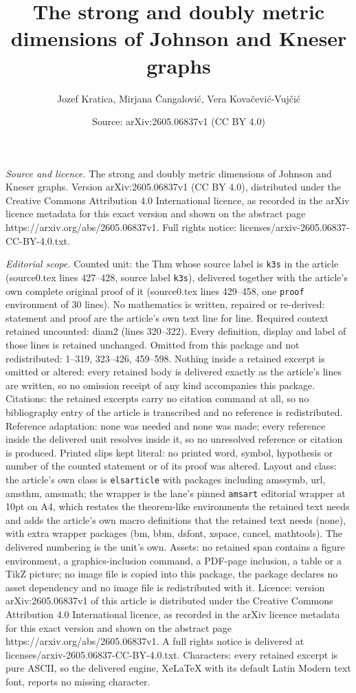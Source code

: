 \documentclass[10pt,a4paper]{amsart}
\title[The strong and doubly metric dimensions of Johnson and Knese]{The strong and doubly metric dimensions of Johnson and Kneser graphs}
\author{Jozef Kratica, Mirjana \v{C}angalovi\'c, Vera Kova\v{c}evi\'c-Vuj\v{c}i\'c}
\date{Source: arXiv:2605.06837v1 (CC BY 4.0)}
\begin{document}
\maketitle

\noindent\emph{Source and licence.} The strong and doubly metric dimensions of Johnson and Kneser graphs. Version arXiv:2605.06837v1 (CC BY 4.0), distributed under the Creative Commons Attribution 4.0 International licence, as recorded in the arXiv licence metadata for this exact version and shown on the abstract page https://arxiv.org/abs/2605.06837v1. Full rights notice: licenses/arxiv-2605.06837-CC-BY-4.0.txt.\par\smallskip

\noindent\textit{Editorial scope.} Counted unit: the Thm whose source label is \texttt{k3s} in the article (source0.tex lines 427--428, source label \texttt{k3s}), delivered together with the article's own complete original proof of it (source0.tex lines 429--458, one \texttt{proof} environment of 30 lines). No mathematics is written, repaired or re-derived: statement and proof are the article's own text line for line. Required context retained uncounted: diam2 (lines 320--322). Every definition, display and label of those lines is retained unchanged. Omitted from this package and not redistributed: 1--319, 323--426, 459--598. Nothing inside a retained excerpt is omitted or altered: every retained body is delivered exactly as the article's lines are written, so no omission receipt of any kind accompanies this package. Citations: the retained excerpts carry no citation command at all, so no bibliography entry of the article is transcribed and no reference is redistributed. Reference adaptation: none was needed and none was made; every reference inside the delivered unit resolves inside it, so no unresolved reference or citation is produced. Printed slips kept literal: no printed word, symbol, hypothesis or number of the counted statement or of its proof was altered. Layout and class: the article's own class is \texttt{elsarticle} with packages including amssymb, url, amsthm, amsmath; the wrapper is the lane's pinned \texttt{amsart} editorial wrapper at 10pt on A4, which restates the theorem-like environments the retained text needs and adds the article's own macro definitions that the retained text needs (none), with extra wrapper packages (bm, bbm, dsfont, xspace, cancel, mathtools). The delivered numbering is the unit's own. Assets: no retained span contains a figure environment, a graphics-inclusion command, a PDF-page inclusion, a table or a TikZ picture; no image file is copied into this package, the package declares no asset dependency and no image file is redistributed with it. Licence: version arXiv:2605.06837v1 of this article is distributed under the Creative Commons Attribution 4.0 International licence, as recorded in the arXiv licence metadata for this exact version and shown on the abstract page https://arxiv.org/abs/2605.06837v1. A full rights notice is delivered at licenses/arxiv-2605.06837-CC-BY-4.0.txt. Characters: every retained excerpt is pure ASCII, so the delivered engine, XeLaTeX with its default Latin Modern text font, reports no missing character.
\end{document}
